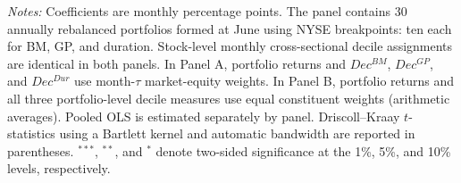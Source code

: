 \begin{table}[!htbp]
    \vspace{0.5em}
    \begin{minipage}{0.98\textwidth}
    \footnotesize
    \textit{Notes:} Coefficients are monthly percentage points. The panel contains 30 annually rebalanced portfolios formed at June using NYSE breakpoints: ten each for BM, GP, and duration. Stock-level monthly cross-sectional decile assignments are identical in both panels. In Panel A, portfolio returns and $Dec^{BM}$, $Dec^{GP}$, and $Dec^{Dur}$ use month-$\tau$ market-equity weights. In Panel B, portfolio returns and all three portfolio-level decile measures use equal constituent weights (arithmetic averages). Pooled OLS is estimated separately by panel. Driscoll--Kraay $t$-statistics using a Bartlett kernel and automatic bandwidth are reported in parentheses. $^{***}$, $^{**}$, and $^{*}$ denote two-sided significance at the 1\%, 5\%, and 10\% levels, respectively.
    \end{minipage}
\end{table}
\FloatBarrier
